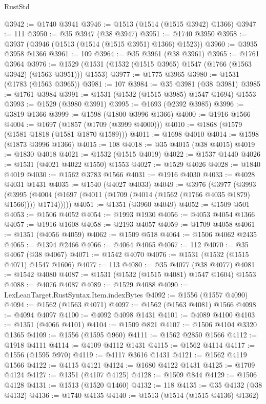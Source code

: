 \begin{lexlean}{RustStd}
\begin{coremodule}
@3942 := @1740 @3941
@3946 := @1513 (@1514 (@1515 @3942) @1366)
@3947 := 111
@3950 := @35 @3947 (@38 @3947)
@3951 := @1740 @3950
@3958 := @3937 (@3946 (@1513 (@1514 (@1515 @3951) @1366) @1523))
@3960 := @3935 @3958 @1366
@3961 := 109
@3964 := @35 @3961 (@38 @3961)
@3965 := @1761 @3964
@3976 := @1529 (@1531 (@1532 (@1515 @3965) @1547 (@1766 (@1563 @3942) (@1563 @3951))) @1553)
@3977 := @1775 @3965
@3980 := @1531 (@1783 (@1563 @3965))
@3981 := 107
@3984 := @35 @3981 (@38 @3981)
@3985 := @1761 @3984
@3991 := @1531 (@1532 (@1515 @3985) @1547 @1694) @1553
@3993 := @1529 (@3980 @3991)
@3995 := @1693 (@2392 @3985)
@3996 := @3819 @1366
@3999 := @1598 (@1800 @3996 @1366)
@4000 := @1916 @1566
@4004 := @1697 (@1857 (@1709 (@3999 @4000)))
@4010 := @1868 (@1579 (@1581 @1818 (@1581 @1870 @1589)))
@4011 := @1698 @4010
@4014 := @1598 (@1873 @3996 @1366)
@4015 := 108
@4018 := @35 @4015 (@38 @4015)
@4019 := @1830 @4018
@4021 := @1532 (@1515 @4019)
@4022 := @1537 @1440
@4026 := @1531 (@4021 @4022 @1550) @1553
@4027 := @1529 @4026
@4028 := @1840 @4019
@4030 := @1562 @3783 @1566
@4031 := @1916 @4030
@4033 := @4028 @4031 @1431
@4035 := @1540 (@4027 @4033)
@4049 := @3976
    (@3977
      (@3993
        (@3995 (@4004 (@1697 (@4011 (@1709 (@4014 (@1562 (@1766 @4035 @1879) @1566)))) @1714)))))
@4051 := @1351 (@3960 @4049)
@4052 := @1509 @501
@4053 := @1506 @4052
@4054 := @1993 @1930
@4056 := @4053 @4054 @1366
@4057 := @1916 @1608
@4058 := @2193 @4057
@4059 := @1709 @4058
@4061 := @1351 (@4056 @4059)
@4062 := @1509 @518
@4064 := @1506 @4062 @2435
@4065 := @1394 @2466
@4066 := @4064 @4065
@4067 := 112
@4070 := @35 @4067 (@38 @4067)
@4071 := @1542 @4070
@4076 := @1531 (@1532 (@1515 @4071) @1547 @1606)
@4077 := 113
@4080 := @35 @4077 (@38 @4077)
@4081 := @1542 @4080
@4087 := @1531 (@1532 (@1515 @4081) @1547 @1604) @1553
@4088 := @4076 @4087
@4089 := @1529 @4088
@4090 := LexLeanTarget.RustSyntax.Item.indexBytes
@4092 := @1556 (@1557 @4090)
@4094 := @1562 (@1563 @4071)
@4097 := @1562 (@1563 @4081) @1566
@4098 := @4094 @4097
@4100 := @4092 @4098 @1431
@4101 := @4089 @4100
@4103 := @1351 (@4066 @4101)
@4104 := @1509 @821
@4107 := @1506 @4104 @3320 @1365
@4109 := @1556 (@1595 @960)
@4111 := @1562 @2850 @1566
@4112 := @1918 @4111
@4114 := @4109 @4112 @1431
@4115 := @1562 @4114
@4117 := @1556 (@1595 @970)
@4119 := @4117 @3616 @1431
@4121 := @1562 @4119 @1566
@4122 := @4115 @4121
@4124 := @1680 @4122 @1431
@4125 := @1709 @4124
@4127 := @1351 (@4107 @4125)
@4128 := @1509 @844
@4129 := @1506 @4128
@4131 := @1513 (@1520 @1460)
@4132 := 118
@4135 := @35 @4132 (@38 @4132)
@4136 := @1740 @4135
@4140 := @1513 (@1514 (@1515 @4136) @1362)

\end{coremodule}
\end{lexlean}
